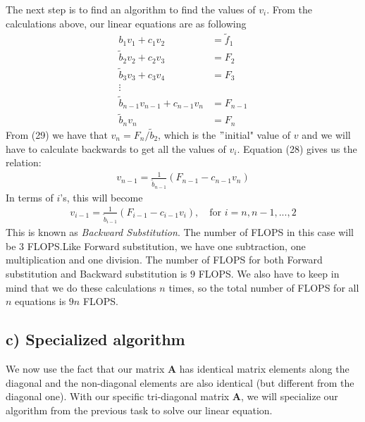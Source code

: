 \documentclass[12pt]{article}
\begin{document}
The next step is to find an algorithm to find the values of $v_i$. From the calculations above, our linear equations are as following
\begin{align}
b_1v_1 + c_1v_2 &= \tilde{f}_1 \\
\tilde{b}_2v_2 + c_2v_3 &= F_2 \\
\tilde{b}_3v_3 + c_3v_4 &= F_3 \\
\vdots \nonumber \\
\tilde{b}_{n-1} v_{n-1} + c_{n-1}v_n &= F_{n-1} \\
\tilde{b}_nv_n &= F_n
\end{align}
From (29) we have that $v_n = F_n/\tilde{b}_2$, which is the $"$initial" value of $v$ and we will have to calculate backwards to get all the values of $v_i$. Equation (28) gives us the relation:
\begin{align*}
v_{n-1} = \frac{1}{\tilde{b}_{n-1}}\left(F_{n-1}-c_{n-1}v_n \right)
\end{align*}
In terms of $i$'s, this will become
\begin{align}
v_{i-1} = \frac{1}{\tilde{b}_{i-1}}\left(F_{i-1} - c_{i-1}v_i \right), \quad \text{for } i = n,n-1,...,2
\end{align}
This is known as \textit{Backward Substitution}. The number of FLOPS in this case will be $3$ FLOPS.Like Forward substitution, we have one subtraction, one multiplication and one division. The number of FLOPS for both Forward substitution and Backward substitution is $9$ FLOPS. We also have to keep in mind that we do these calculations $n$ times, so the total number of FLOPS for all $n$ equations is $9n$ FLOPS.
\subsection*{c) Specialized algorithm}
We now use the fact that our matrix $\mathbf{A}$ has identical matrix elements along the diagonal and the non-diagonal elements are also identical (but different from the diagonal one). With our specific tri-diagonal matrix $\mathbf{A}$, we will specialize our algorithm from the previous task to solve our linear equation.
\end{document}
